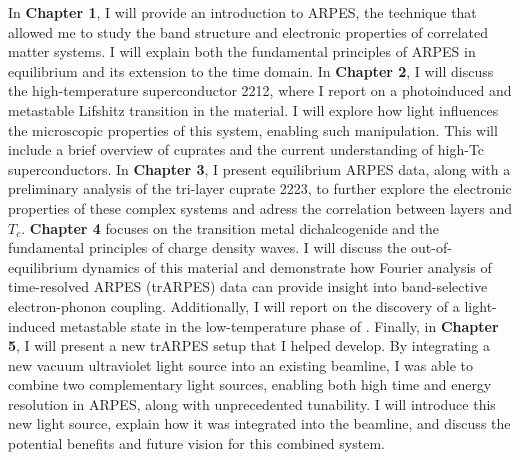 In \textbf{Chapter 1}, I will provide an introduction to ARPES, the technique that allowed me to study the band structure and electronic properties of correlated matter systems.
I will explain both the fundamental principles of ARPES in equilibrium and its extension to the time domain.
In \textbf{Chapter 2}, I will discuss the high-temperature superconductor 2212, where I report on a photoinduced and metastable Lifshitz transition in the material.
I will explore how light influences the microscopic properties of this system, enabling such manipulation.
This will include a brief overview of cuprates and the current understanding of high-Tc superconductors.
In \textbf{Chapter 3}, I present equilibrium ARPES data, along with a preliminary analysis of the tri-layer cuprate 2223, to further explore the electronic properties of these complex systems and adress the correlation between  layers and $T_c$.
\textbf{Chapter 4} focuses on the transition metal dichalcogenide  and the fundamental principles of charge density waves.
I will discuss the out-of-equilibrium dynamics of this material and demonstrate how Fourier analysis of time-resolved ARPES (trARPES) data can provide insight into band-selective electron-phonon coupling.
Additionally, I will report on the discovery of a light-induced metastable state in the low-temperature phase of .
Finally, in \textbf{Chapter 5}, I will present a new trARPES setup that I helped develop.
By integrating a new vacuum ultraviolet light source into an existing beamline, I was able to combine two complementary light sources, enabling both high time and energy resolution in ARPES, along with unprecedented tunability.
I will introduce this new light source, explain how it was integrated into the beamline, and discuss the potential benefits and future vision for this combined system.
